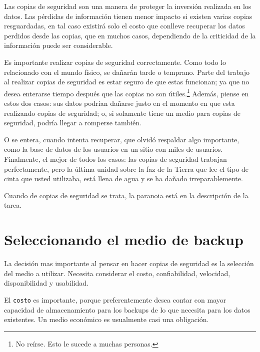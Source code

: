 \documentclass[12pt]{article}
\begin{document}

Las copias de seguridad son una manera de proteger la inversión realizada 
en los datos. Las pérdidas de información tienen menor impacto si existen 
varias copias resguardadas, en tal caso existirá solo el costo que conlleve
recuperar los datos perdidos desde las copias, que en muchos casos, 
dependiendo de la criticidad de la información puede ser   
considerable. 

Es importante realizar copias de seguridad correctamente. Como todo lo 
relacionado con el mundo físico, se dañarán tarde o temprano. Parte del
trabajo al realizar copias de seguridad es estar seguro de que estas 
funcionan; ya que no desea enterarse tiempo después que las copias no son 
útiles.\footnote{No reírse. Esto le sucede a muchas personas.} Además,
 piense en estos dos casos: sus datos podrían dañarse justo en el momento 
en que esta realizando copias de seguridad; o, si solamente tiene un medio 
para copias de seguridad, podría llegar a romperse también. 

O se entera, cuando intenta recuperar, que olvidó respaldar algo importante,
como la base de datos de los usuarios en un sitio con miles de usuarios. 
Finalmente, el mejor de todos los casos: las copias de seguridad trabajan 
perfectamente, pero la última unidad sobre la faz de la Tierra que lee el 
tipo de cinta que usted utilizaba, está llena de agua y se ha dañado 
irreparablemente.

Cuando de copias de seguridad se trata, la paranoia está en la descripción 
de la tarea.

\section*{Seleccionando el medio de backup}

La decisión mas importante al pensar en hacer copias de seguridad es la 
selección del medio a utilizar. Necesita considerar el costo, 
confiabilidad, velocidad, disponibilidad y usabilidad.

El \texttt{costo} es importante, porque preferentemente desea contar con 
mayor 
capacidad de almacenamiento para los backups de lo que necesita para los 
datos existentes. Un medio económico es usualmente casi una obligación.
\end{document}
